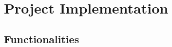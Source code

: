 \chapter{Project Implementation}
\label{chapter:chapter3}

\section{Functionalities}
\label{sub-sec:chapter3-section1}

